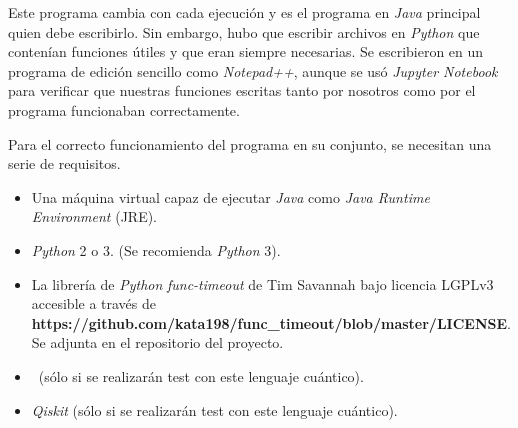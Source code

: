 Este programa cambia con cada ejecución y es el programa en \textit{Java} principal quien debe escribirlo. Sin embargo, hubo que escribir archivos en \textit{Python} que contenían funciones útiles y que eran siempre necesarias. Se escribieron en un programa de edición sencillo como \textit{Notepad++}, aunque se usó \textit{Jupyter Notebook} para verificar que nuestras funciones escritas tanto por nosotros como por el programa funcionaban correctamente.

Para el correcto funcionamiento del programa en su conjunto, se necesitan una serie de requisitos.

\begin{itemize}
\item Una máquina virtual capaz de ejecutar \textit{Java} como \textit{Java Runtime Environment} (JRE).
\item \textit{Python} 2 o 3. (Se recomienda \textit{Python} 3).
\item La librería de \textit{Python} \textit{func-timeout} de Tim Savannah bajo licencia LGPLv3 accesible a través de \textbf{https://github.com/kata198/func\_timeout/blob/master/LICENSE}. Se adjunta en el repositorio del proyecto.
\item \qsh\ (sólo si se realizarán test con este lenguaje cuántico).
\item \textit{Qiskit} (sólo si se realizarán test con este lenguaje cuántico).
\end{itemize}